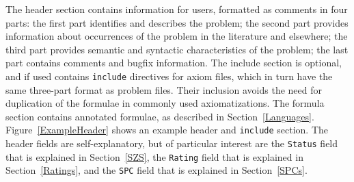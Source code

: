 \documentclass{easychair}
\begin{document}
The header section contains information for users, formatted as comments in four parts:
the first part identifies and describes the problem;
the second part provides information about occurrences of the problem
in the literature and elsewhere;
the third part provides semantic and syntactic characteristics of the problem;
the last part contains comments and bugfix information.
The include section is optional, and if used contains {\tt include} directives for axiom files,
which in turn have the same three-part format as problem files.
Their inclusion avoids the need for duplication of the formulae in commonly used axiomatizations.
The formula section contains annotated formulae, as described in Section~\ref{Languages}.
Figure~\ref{ExampleHeader} shows an example header and {\tt include} section.
The header fields are self-explanatory, but of particular interest are the {\tt Status} field 
that is explained in Section~\ref{SZS}, the {\tt Rating} field that is explained in 
Section~\ref{Ratings}, and the {\tt SPC} field that is explained in Section~\ref{SPCs}.
\end{document}

